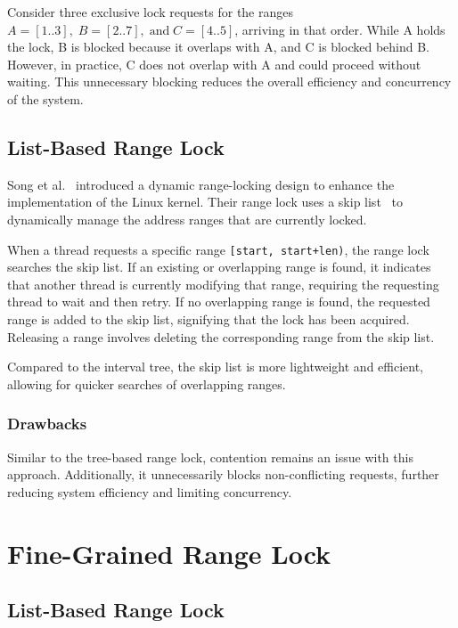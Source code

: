 Consider three exclusive lock requests for the ranges \( A = [1..3], \; B = [2..7], \; \text{and} \; C = [4..5] \), arriving in that order. While A holds the lock, B is blocked because it overlaps with A, and C is blocked behind B. However, in practice, C does not overlap with A and could proceed without waiting. This unnecessary blocking reduces the overall efficiency and concurrency of the system.

\subsection{List-Based Range Lock}

Song et al.~\parencite{song2013parallelizing} introduced a dynamic range-locking design to enhance the implementation of the Linux kernel. Their range lock uses a skip list~\parencite{pugh1990skip} to dynamically manage the address ranges that are currently locked.

When a thread requests a specific range \texttt{[start, start+len)}, the range lock searches the skip list. If an existing or overlapping range is found, it indicates that another thread is currently modifying that range, requiring the requesting thread to wait and then retry. If no overlapping range is found, the requested range is added to the skip list, signifying that the lock has been acquired. Releasing a range involves deleting the corresponding range from the skip list.

Compared to the interval tree, the skip list is more lightweight and efficient, allowing for quicker searches of overlapping ranges.

\subsubsection*{Drawbacks}

Similar to the tree-based range lock, contention remains an issue with this approach. Additionally, it unnecessarily blocks non-conflicting requests, further reducing system efficiency and limiting concurrency.

\section{Fine-Grained Range Lock}

\subsection{List-Based Range Lock}

